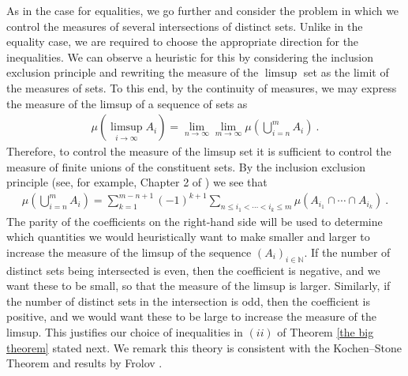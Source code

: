 \documentclass[12pt]{article}
\begin{document}


As in the case for equalities, we go further and consider the problem in which we control the measures of several intersections of distinct sets. Unlike in the equality case, we are required to choose the appropriate direction for the inequalities. We can observe a heuristic for this by considering the inclusion exclusion principle and rewriting the measure of the $\limsup$ set as the limit of the measures of sets. To this end, by the continuity of measures, we may express the measure of the limsup of a sequence of sets as
\begin{align}
  \mu\left(\limsup_{i \rightarrow \infty} A_i \right) = \lim_{n\rightarrow \infty} \lim_{m\rightarrow \infty} \mu \left(\bigcup_{i = n}^m A_i \right) \label{limit union} ~.
\end{align}
 Therefore, to control the measure of the limsup set it is sufficient to control the measure of finite unions of the constituent sets. By the inclusion exclusion principle (see, for example, Chapter 2 of \cite{billingsley1995probability}) we see that
\begin{align}\label{inclusionexclusion}
    \mu \left(\bigcup_{i=n}^{m} A_i \right) = \sum_{k=1}^{m-n+1} (-1)^{k+1} \sum_{n \leq i_1 < \cdots < i_k \leq m} \mu ( A_{i_1} \cap \cdots \cap A_{i_k} ) ~.
\end{align}
        The parity of the coefficients on the right-hand side will be used to determine which quantities we would heuristically want to make smaller and larger to increase the measure of the limsup of the sequence $(A_i)_{i \in \mathbb{N}}$. If the number of distinct sets being intersected is even, then the coefficient is negative, and we want these to be small, so that the measure of the limsup is larger. Similarly, if the number of distinct sets in the intersection is odd, then the coefficient is positive, and we would want these to be large to increase the measure of the limsup. This justifies our choice of inequalities in $(ii)$ of Theorem \ref{the big theorem} stated next. We remark this theory is consistent with the Kochen--Stone Theorem and results by Frolov \cite{Frolov2012}.
\end{document}
